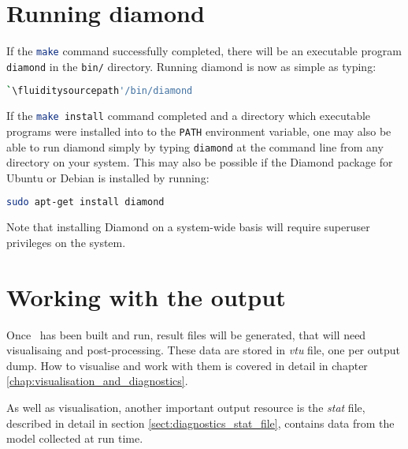 \section{Running diamond}
\label{sect:running_diamond}

If the \lstinline[language=Bash]+make+ command successfully completed, there will be an
executable program \lstinline[language=Bash]+diamond+ in the
\lstinline[language=Bash]+bin/+ directory. Running diamond is now as simple as
typing:

\begin{lstlisting}[language=Bash]
`\fluiditysourcepath'/bin/diamond
\end{lstlisting}

If the \lstinline[language=Bash]+make install+ command completed and a directory
which executable programs were installed into to the
\lstinline[language=Bash]+PATH+ environment variable, one may also be able to run
diamond simply by typing \lstinline[language=Bash]+diamond+ at the command line
from any directory on your system. This may also be possible if the
Diamond package for Ubuntu or Debian is installed by running:

\begin{lstlisting}[language=Bash]
sudo apt-get install diamond
\end{lstlisting}

Note that installing Diamond on a system-wide basis will require superuser privileges on the system.

\section{Working with the output}
\label{sect:working_with_output}

Once \fluidity\ has been built and run, result files will be generated, that will need visualisaing
and post-processing. These data are stored in \emph{vtu} file, one per output dump. 
How to visualise and work with them is covered in detail in chapter
\ref{chap:visualisation_and_diagnostics}.

As well as visualisation, another important output resource is the \emph{stat} file,
described in detail in section \ref{sect:diagnostics_stat_file}, contains data from the model
collected at run time.

\website




